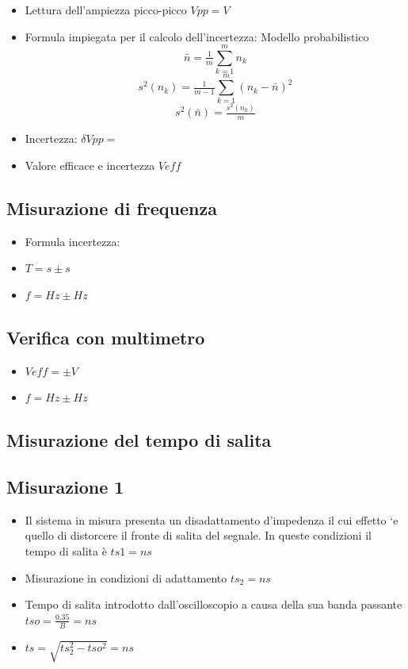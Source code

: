 \documentclass[a4paper]{article}
\begin{document}
\begin{itemize}
\item Lettura dell’ampiezza picco-picco {\(Vpp= V\)}
\item Formula impiegata per il calcolo dell’incertezza: Modello probabilistico \[\bar{n} = \tfrac{1}{m}\sum_{k=1}^m n_k \]
\[s^2 (n_k)= \tfrac{1}{m-1}\sum_{k=1}^m (n_k - \bar{n})^2 \] 
\[s^2 (\bar{n}) = \tfrac{s^2 (n_k)}{m}\]
\item Incertezza: \(\delta{}  Vpp= \)
\item Valore efficace e incertezza \(Veff \)
\end{itemize}

\subsection{Misurazione di frequenza}
\begin{itemize}
\item Formula incertezza:
\item \(T= s\pm s \)
\item \(f= Hz \pm Hz\)
\end{itemize}

\subsection{Verifica con multimetro}
\begin{itemize}
\item \(Veff= \pm V \)
\item \(f= Hz \pm Hz \)
\end{itemize}


\begin{tcolorbox}[breakable,colback=cyan,colframe=cyan]
\section*{Misurazione del tempo di salita}
\end{tcolorbox}


\subsection{ Misurazione 1}
\begin{itemize}
\item Il sistema in misura presenta un disadattamento d’impedenza il cui effetto `e quello di distorcere il fronte di salita del segnale. In queste condizioni il tempo di salita è \(ts1 = ns\)
\item Misurazione in condizioni di adattamento \(ts_2 = ns\) 
\item Tempo di salita introdotto dall’oscilloscopio a causa della sua banda passante \(tso=\tfrac{0.35}{B} = ns\)
\item \(ts= \sqrt{ts_2^2 -tso^2} = ns\)
\end{itemize}
\end{document}
